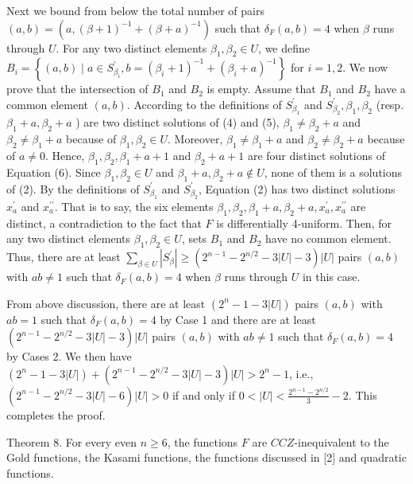 \documentclass[10pt]{article}
\begin{document}
Next we bound from below the total number of pairs $(a, b)=\left(a,(\beta+1)^{-1}+(\beta+a)^{-1}\right)$ such that $\delta_{F}(a, b)=4$ when $\beta$ runs through $U$. For any two distinct elements $\beta_{1}, \beta_{2} \in U$, we define $B_{i}=\left\{(a, b) \mid a \in S_{\beta_{i}}^{\prime}, b=\left(\beta_{i}+1\right)^{-1}+\left(\beta_{i}+a\right)^{-1}\right\}$ for $i=1,2$. We now prove that the intersection of $B_{1}$ and $B_{2}$ is empty. Assume that $B_{1}$ and $B_{2}$ have a common element $(a, b)$. According to the definitions of $S_{\beta_{1}}^{\prime}$ and $S_{\beta_{2}}^{\prime}, \beta_{1}, \beta_{2}$ (resp. $\beta_{1}+a, \beta_{2}+a$ ) are two distinct solutions of (4) and (5), $\beta_{1} \neq \beta_{2}+a$ and $\beta_{2} \neq \beta_{1}+a$ because of $\beta_{1}, \beta_{2} \in U$. Moreover, $\beta_{1} \neq \beta_{1}+a$ and $\beta_{2} \neq \beta_{2}+a$ because of $a \neq 0$. Hence, $\beta_{1}, \beta_{2}, \beta_{1}+a+1$ and $\beta_{2}+a+1$ are four distinct solutions of Equation (6). Since $\beta_{1}, \beta_{2} \in U$ and $\beta_{1}+a, \beta_{2}+a \notin U$, none of them is a solutions of (2). By the definitions of $S_{\beta_{1}}^{\prime}$ and $S_{\beta_{2}}^{\prime}$, Equation (2) has two distinct solutions $x_{a}^{\prime}$ and $x_{a}^{\prime \prime}$. That is to say, the six elements $\beta_{1}, \beta_{2}, \beta_{1}+a, \beta_{2}+a, x_{a}^{\prime}, x_{a}^{\prime \prime}$ are distinct, a contradiction to the fact that $F$ is differentially 4-uniform. Then, for any two distinct elements $\beta_{1}, \beta_{2} \in U$, sets $B_{1}$ and $B_{2}$ have no common element. Thus, there are at least $\sum_{\beta \in U}\left|S_{\beta}^{\prime}\right| \geq\left(2^{n-1}-2^{n / 2}-3|U|-3\right)|U|$ pairs $(a, b)$ with $a b \neq 1$ such that $\delta_{F}(a, b)=4$ when $\beta$ runs through $U$ in this case.

From above discussion, there are at least $\left(2^{n}-1-3|U|\right)$ pairs $(a, b)$ with $a b=1$ such that $\delta_{F}(a, b)=4$ by Case 1 and there are at least $\left(2^{n-1}-2^{n / 2}-3|U|-3\right)|U|$ pairs $(a, b)$ with $a b \neq 1$ such that $\delta_{F}(a, b)=4$ by Cases 2. We then have $\left(2^{n}-1-3|U|\right)+\left(2^{n-1}-2^{n / 2}-3|U|-3\right)|U|> 2^{n}-1$, i.e., $\left(2^{n-1}-2^{n / 2}-3|U|-6\right)|U|>0$ if and only if $0<|U|<\frac{2^{n-1}-2^{n / 2}}{3}-2$. This completes the proof.

Theorem 8. For every even $n \geq 6$, the functions $F$ are $C C Z$-inequivalent to the Gold functions, the Kasami functions, the functions discussed in [2] and quadratic functions.
\end{document}
